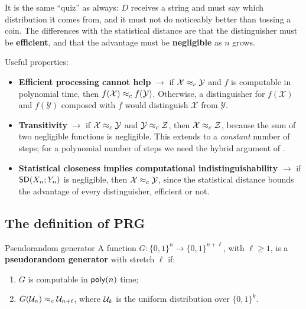 It is the same ``quiz'' as always: $D$ receives a string and must say which distribution it comes from, and it must not do noticeably better than tossing a coin. The differences with the statistical distance are that the distinguisher must be \textbf{efficient}, and that the advantage must be \textbf{negligible} as $n$ grows.

Useful properties:
\begin{itemize}
  \item \textbf{Efficient processing cannot help} $\to$ if $\mathcal{X} \approx_c \mathcal{Y}$ and $f$ is computable in polynomial time, then $f(\mathcal{X}) \approx_c f(\mathcal{Y})$. Otherwise, a distinguisher for $f(\mathcal{X})$ and $f(\mathcal{Y})$ composed with $f$ would distinguish $\mathcal{X}$ from $\mathcal{Y}$.
  \item \textbf{Transitivity} $\to$ if $\mathcal{X} \approx_c \mathcal{Y}$ and $\mathcal{Y} \approx_c \mathcal{Z}$, then $\mathcal{X} \approx_c \mathcal{Z}$, because the sum of two negligible functions is negligible. This extends to a \textit{constant} number of steps; for a polynomial number of steps we need the hybrid argument of .
  \item \textbf{Statistical closeness implies computational indistinguishability} $\to$ if $\mathsf{SD}(X_n; Y_n)$ is negligible, then $\mathcal{X} \approx_c \mathcal{Y}$, since the statistical distance bounds the advantage of every distinguisher, efficient or not.
\end{itemize}

\subsection{The definition of PRG}

\begin{frameddefn}[label={def:prg}]{Pseudorandom generator}
  A function $G : \{0,1\}^n \to \{0,1\}^{n+\ell}$, with $\ell \geq 1$, is a \textbf{pseudorandom generator} with stretch $\ell$ if:
  \begin{enumerate}
    \item $G$ is computable in $\mathsf{poly}(n)$ time;
    \item $G(\mathcal{U}_{n}) \approx_c \mathcal{U}_{n+\ell}$, where $\mathcal{U}_{k}$ is the uniform distribution over $\{0,1\}^k$.
  \end{enumerate}
\end{frameddefn}

